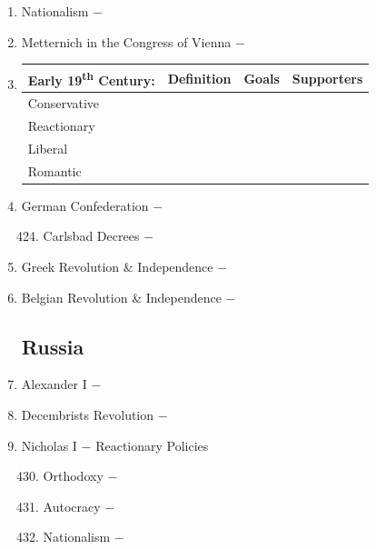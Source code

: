 \documentclass[12pt]{article}
\begin{document}
\begin{enumerate}
\item Nationalism $-$

\item Metternich in the Congress of Vienna $-$

\item \begin{tabular}{l c c c}

\hline  
Early 19\textsuperscript{th} Century: & Definition & Goals & Supporters \\
\hline
Conservative & & & \\
\hline
Reactionary & & & \\
\hline
Liberal & & & \\
\hline
Romantic & & & \\
\hline

\end{tabular}

\item German Confederation $-$

\begin{enumerate}[label=\arabic{*}.]
\setcounter{enumii}{423}

\item Carlsbad Decrees $-$

\end{enumerate}
\setcounter{enumi}{424}

\item Greek Revolution \& Independence $-$

\item Belgian Revolution \& Independence $-$

\subsection{Russia}

\item Alexander I $-$ 

\item Decembrists Revolution $-$ 

\item Nicholas I $-$ Reactionary Policies

\begin{enumerate}[label=\arabic{*}.]
\setcounter{enumii}{429}

\item Orthodoxy $-$

\item Autocracy $-$ 

\item Nationalism $-$ 


\end{enumerate}
\end{enumerate}
\end{document}
